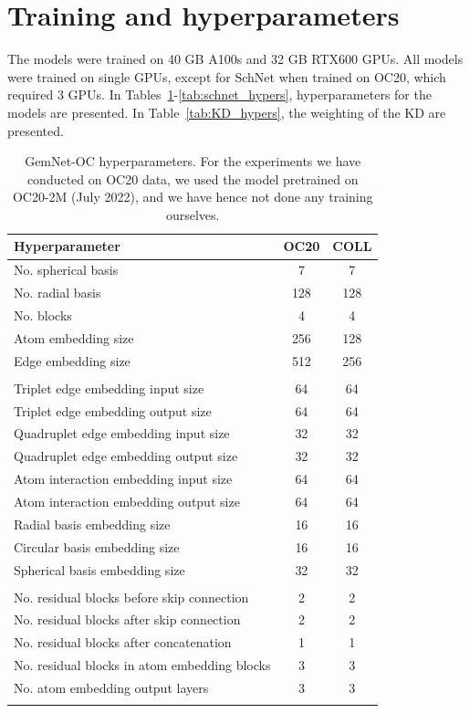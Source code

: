 \documentclass{article}
\begin{document}
\section{Training and hyperparameters} 
\label{ap:train_hyperparams}
The models were trained on 40 GB A100s and 32 GB RTX600 GPUs. All models were trained on single GPUs, except for SchNet when trained on OC20, which required 3 GPUs.
In Tables~\ref{tab:GemNet_hypers}-\ref{tab:schnet_hypers}, hyperparameters for the models are presented. In Table~\ref{tab:KD_hypers}, the weighting of the KD are presented.
\begin{table}[H]
\centering
\caption{GemNet-OC hyperparameters. For the experiments we have conducted on OC20 data, we used the model pretrained on OC20-2M (July 2022), and we have hence not done any training ourselves.}
\begin{tabular}{lcc}
\label{tab:GemNet_hypers}
Hyperparameter & OC20 & COLL\\\hline
No. spherical basis & 7 & 7 \\
No. radial basis & 128 & 128\\
No. blocks & 4 & 4\\
Atom embedding size & 256 & 128 \\
Edge embedding size & 512 & 256 \\\\

Triplet edge embedding input size & 64 & 64\\
Triplet edge embedding output size & 64 & 64\\
Quadruplet edge embedding input size & 32 & 32\\
Quadruplet edge embedding output size & 32 & 32\\
Atom interaction embedding input size & 64 & 64\\
Atom interaction embedding output size & 64 & 64\\
Radial basis embedding size & 16 & 16\\
Circular basis embedding size & 16 & 16  \\
Spherical basis embedding size & 32 & 32 \\\\

No. residual blocks before skip connection & 2 & 2\\
No. residual blocks after skip connection & 2 & 2\\
No. residual blocks after concatenation & 1 & 1 \\
No. residual blocks in atom embedding blocks & 3 & 3 \\
No. atom embedding output layers & 3 & 3 \\\\


\end{tabular}
\end{table}
\end{document}

